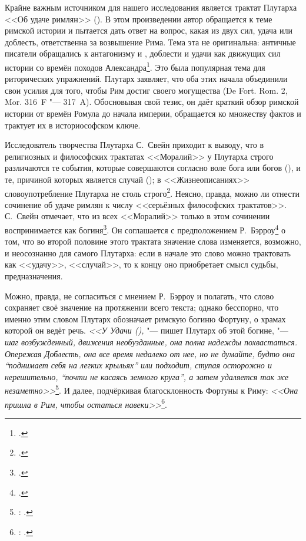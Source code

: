 Крайне важным источником для нашего исследования является трактат Плутарха <<Об удаче римлян>> (). В этом произведении автор обращается к теме римской истории и пытается дать ответ на вопрос, какая из двух сил, удача или доблесть, ответственна за возвышение Рима. Тема эта не оригинальна: античные писатели обращались к антагонизму  и , доблести и удачи как движущих сил истории со времён походов Александра\footcite[С. 165]{Fritz2007}. Это была популярная тема для риторических упражнений. Плутарх заявляет, что оба этих начала объединили свои усилия для того, чтобы Рим достиг своего могущества (De Fort. Rom. 2, Mor. 316~F "--- 317~A). Обосновывая свой тезис, он даёт краткий обзор римской истории от времён Ромула до начала империи, обращается ко множеству фактов и трактует их в историософском ключе.

Исследователь творчества Плутарха С.~Свейн приходит к выводу, что в религиозных и философских трактатах <<Моралий>> у Плутарха строго различаются те события, которые совершаются согласно воле бога или богов (), и те, причиной которых является случай (); в <<Жизнеописаниях>> словоупотребление Плутарха не столь строго\footcite[P. 273]{Swain1989a}. Неясно, правда, можно ли отнести сочинение об удаче римлян к числу <<серьёзных философских трактатов>>. С.~Свейн отмечает, что из всех <<Моралий>> только в этом сочинении  воспринимается как богиня\footcite[P. 506]{Swain1989}. Он соглашается с предположением Р.~Бэрроу\footcite[P. 126--127]{Barrow1967} о том, что во второй половине этого трактата значение слова  изменяется, возможно, и неосознанно для самого Плутарха: если в начале это слово можно трактовать как <<удачу>>, <<случай>>, то к концу оно приобретает смысл судьбы, предназначения.

Можно, правда, не согласиться с мнением Р.~Бэрроу и полагать, что слово  сохраняет своё значение на протяжении всего текста; однако бесспорно, что именно этим словом Плутарх обозначает римскую богиню Фортуну, о храмах которой он ведёт речь. \textit{<<У Удачи (),} "--- пишет Плутарх об этой богине, "--- \textit{шаг возбужденный, движения необузданные, она полна надежды похвастаться. Опережая Доблесть, она все время недалеко от нее, но не думайте, будто она ``поднимает себя на легких крыльях'' или подходит, ступая осторожно и нерешительно, ``почти не касаясь земного круга'', а затем удаляется так же незаметно>>}\footnote{: .}. И далее, подчёркивая благосклонность Фортуны к Риму: \textit{<<Она пришла в Рим, чтобы остаться навеки>>}\footnote{: .}.

